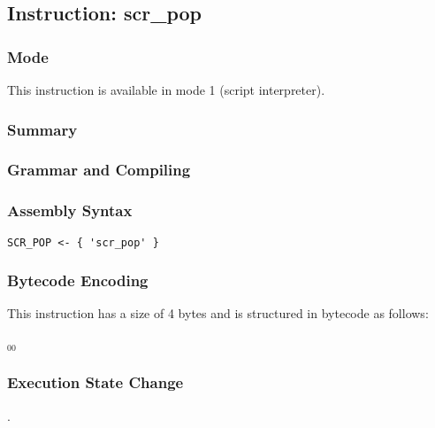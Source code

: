\subsection{Instruction: scr\_pop}

\subsubsection{Mode}
This instruction is available in mode 1 (script interpreter).
\subsubsection{Summary}


\subsubsection{Grammar and Compiling}


\subsubsection{Assembly Syntax}

\begin{myquote}
\begin{verbatim}
SCR_POP <- { 'scr_pop' }
\end{verbatim}
\end{myquote}

\subsubsection{Bytecode Encoding}

This instruction has a size of 4 bytes and is structured in bytecode as follows:

$_{00}$\ 

\subsubsection{Execution State Change}

.



